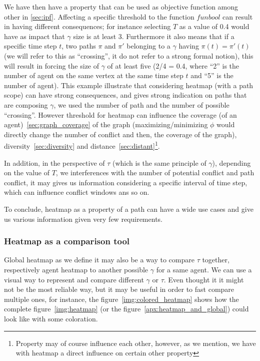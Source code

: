 We have then have a property that can be used as objective function among other in \ref{sec:ipf}. Affecting a specific threshold to the function \(funbool\) can result in having different consequences; for instance selecting \(T\) as a value of 0.4 would have as impact that \(\gamma\) size is at least 3. Furthermore it also means that if a specific time step \(t\), two paths \(\pi\) and \(\pi'\) belonging to a \(\gamma\) having \(\pi(t) = \pi'(t)\) (we will refer to this as ``crossing'', it do not refer to a strong formal notion), this will result in forcing the size of \(\gamma\) of at least five (2/4 = 0.4, where ``2'' is the number of agent on the same vertex at the same time step \(t\) and ``5'' is the number of agent). This example illustrate that considering heatmap (with a path scope) can have strong consequences, and gives strong indication on paths that are composing \(\gamma\), we used the number of path and the number of possible ``crossing''. However threshold for heatmap can influence the coverage (of an agent)~\ref{sec:graph_coverage} of the graph (maximizing/minimizing \(\phi\) would directly change the number of conflict and then, the coverage of the graph), diversity~\ref{sec:diversity} and distance~\ref{sec:distant}\footnote{Property may of course influence each other, however, as we mention, we have with heatmap a direct influence on certain other property}.

In addition, in the perspective of \(\tau\) (which is the same principle of \(\gamma\)), depending on the value of \(T\), we interferences with the number of potential conflict and path conflict, it may gives us information considering a specific interval of time step, which can influence conflict windows ans so on.

To conclude, heatmap as a property of a path can have a wide use cases and give us various information given very few requirements.

\subsubsection{Heatmap as a comparison tool}

Global heatmap as we define it may also be a way to compare \(\tau\) together, respectively agent heatmap to another possible \(\gamma\) for a same agent. We can use a visual way to represent and compare different \(\gamma\) or \(\tau\). Even thought it it might not be the most reliable way, but it may be useful in order to fast compare multiple ones, for instance, the figure~\ref{img:colored_heatmap} shows how the complete figure~\ref{img:heatmap} (or the figure~\ref{apx:heatmap_and_global}) could look like with some coloration.  

